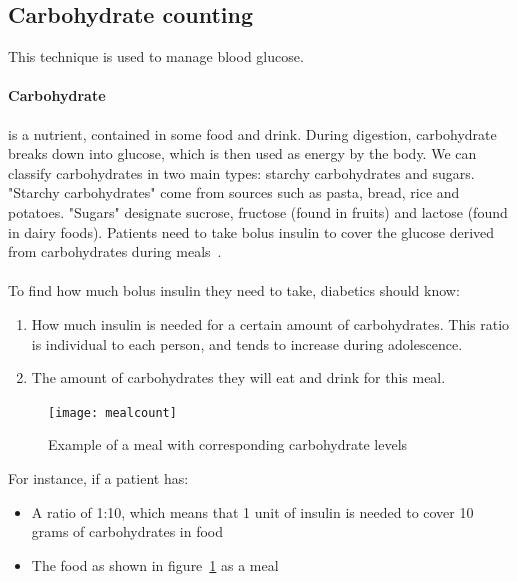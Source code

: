 \fi

\subsection{Carbohydrate counting} 
\label{sec:ccount}
This technique is used to manage blood glucose. \paragraph{Carbohydrate} is a nutrient, contained in some food and drink. During digestion, carbohydrate breaks down into glucose, which is then used as energy by the body. 
We can classify carbohydrates in two main types: starchy carbohydrates and sugars. 
"Starchy carbohydrates" come from sources such as pasta, bread, rice and potatoes. "Sugars" designate sucrose, fructose (found in fruits) and lactose (found in dairy foods). Patients need to take bolus insulin to cover the glucose derived from carbohydrates during meals~\cite{carbcountPdf}. 
\paragraph{}To find how much bolus insulin they need to take, diabetics should know:
\begin{enumerate}
\item How much insulin is needed for a certain amount of carbohydrates. This ratio is individual to each person, and tends to increase during adolescence.
\item The amount of carbohydrates they will eat and drink for this meal.
\end{enumerate}

\begin{figure}[h]
  \centering
  \caption{Example of a meal with corresponding carbohydrate levels~\cite{refhowtocarbPic}}
  \texttt{[image: mealcount]}
  \label{fig:mealcount}
\end{figure}

For instance, if a patient has:
\begin{itemize}
\item A ratio of 1:10, which means that 1 unit of insulin is needed to cover 10 grams of carbohydrates in food
\item The food as shown in figure~\ref{fig:mealcount} as a meal
\end{itemize}



